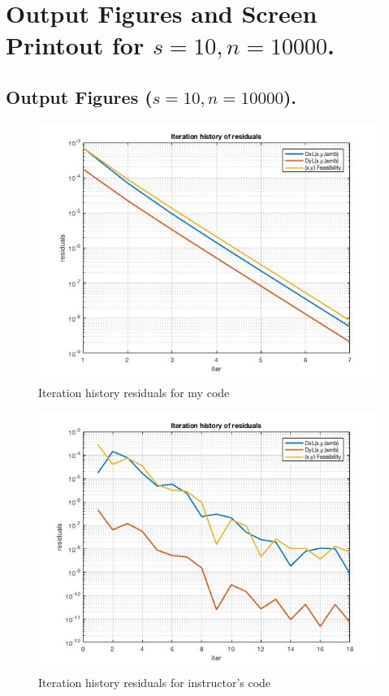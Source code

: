 \clearpage
\section{Output Figures and Screen Printout for $s=10,n=10000$.}
\subsection{Output Figures ($s=10,n=10000$).}
\begin{figure}[H]
\centering
\includegraphics[width=12cm]{F_6/F_1_2.jpg}
\caption{Iteration history residuals for my code}
\end{figure}
\begin{figure}[H]
\centering
\includegraphics[width=12cm]{F_6/F_1_3.jpg}
\caption{Iteration history residuals for instructor's code}
\end{figure}

